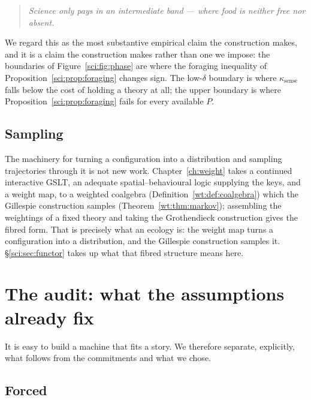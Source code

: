 \begin{quote}
\itshape Science only pays in an intermediate band --- where food is neither free nor absent.
\end{quote}

We regard this as the most substantive empirical claim the construction makes, and it is a claim the
construction makes rather than one we impose: the boundaries of Figure~\ref{sci:fig:phase} are where the
foraging inequality of Proposition~\ref{sci:prop:foraging} changes sign. The low-$\delta$ boundary is
where $\kappa_{\mathrm{sense}}$ falls below the cost of holding a theory at all; the upper boundary is
where Proposition~\ref{sci:prop:foraging} fails for every available $P$.

\subsection{Sampling}\label{sci:S13.3}

The machinery for turning a configuration into a distribution and sampling trajectories through it is
not new work. Chapter~\ref{ch:weight} takes a continued interactive GSLT, an adequate
spatial--behavioural logic supplying the keys, and a weight map, to a weighted coalgebra
(Definition~\ref{wt:def:coalgebra}) which the Gillespie construction samples
(Theorem~\ref{wt:thm:markov}); assembling the weightings of a fixed theory and taking
the Grothendieck construction gives the fibred form. That is
precisely what an ecology is: the weight map turns a configuration into a distribution, and the
Gillespie construction samples it. \S\ref{sci:sec:functor} takes up what that fibred structure means here.

\section{The audit: what the assumptions already fix}\label{sci:S14}
\label{sci:sec:audit}

It is easy to build a machine that fits a story. We therefore separate, explicitly, what follows from
the commitments and what we chose.

\subsection{Forced}\label{sci:S14.1}

